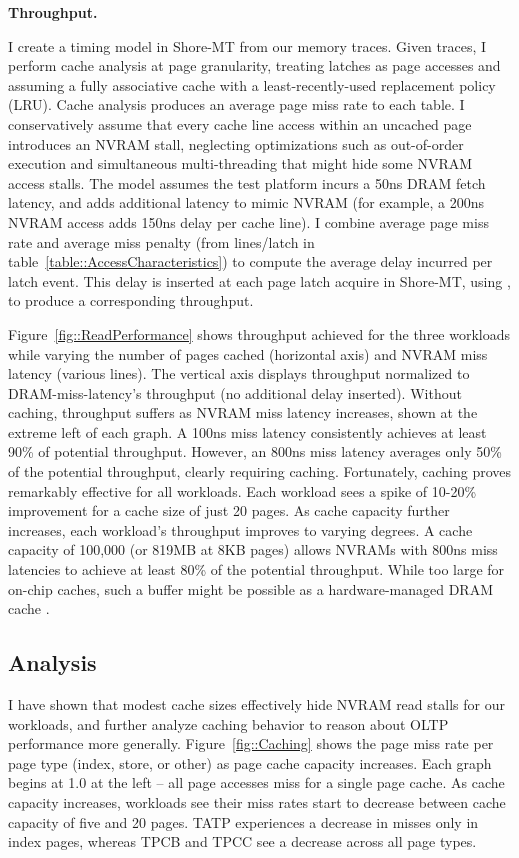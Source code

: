 \textbf{Throughput.}

I create a timing model in Shore-MT from our memory traces.
Given traces, I perform cache analysis at page granularity, treating latches as page accesses and assuming a fully associative cache with a least-recently-used replacement policy (LRU).
Cache analysis produces an average page miss rate to each table.
I conservatively assume that every cache line access within an uncached page introduces an NVRAM stall, neglecting optimizations such as out-of-order execution and simultaneous multi-threading that might hide some NVRAM access stalls. 
The model assumes the test platform incurs a 50ns DRAM fetch latency, and adds additional latency to mimic NVRAM (for example, a 200ns NVRAM access adds 150ns delay per cache line).
I combine average page miss rate and average miss penalty (from lines/latch in table~\ref{table::AccessCharacteristics}) to compute the average delay incurred per latch event.
This delay is inserted at each page latch acquire in Shore-MT, using \InPlace, to produce a corresponding throughput.

Figure~\ref{fig::ReadPerformance} shows throughput achieved for the three workloads while varying the number of pages cached (horizontal axis) and NVRAM miss latency (various lines).
The vertical axis displays throughput normalized to DRAM-miss-latency's throughput (no additional delay inserted).
Without caching, throughput suffers as NVRAM miss latency increases, shown at the extreme left of each graph.
A 100ns miss latency consistently achieves at least 90\% of potential throughput.
However, an 800ns miss latency averages only 50\% of the potential throughput, clearly requiring caching.
Fortunately, caching proves remarkably effective for all workloads.
Each workload sees a spike of 10-20\% improvement for a cache size of just 20 pages.
As cache capacity further increases, each workload's throughput improves to varying degrees.
A cache capacity of 100,000 (or 819MB at 8KB pages) allows NVRAMs with 800ns miss latencies to achieve at least 80\% of the potential throughput.
While too large for on-chip caches, such a buffer might be possible as a hardware-managed DRAM cache \cite{QureshiSrinivasan09}.

\subsection{Analysis}
\label{sec:OLTP_eval:Reads:Analysis}

I have shown that modest cache sizes effectively hide NVRAM read stalls for our workloads, and further analyze caching behavior to reason about OLTP performance more generally.
Figure~\ref{fig::Caching} shows the page miss rate per page type (index, store, or other) as page cache capacity increases.
Each graph begins at 1.0 at the left -- all page accesses miss for a single page cache.
As cache capacity increases, workloads see their miss rates start to decrease between cache capacity of five and 20 pages.
TATP experiences a decrease in misses only in index pages, whereas TPCB and TPCC see a decrease across all page types.

